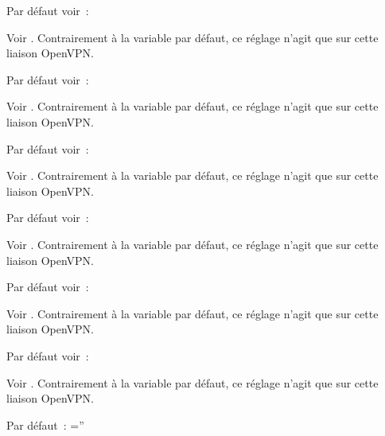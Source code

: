 \begin{description}

  Par défaut voir~: 

  Voir . Contrairement
  à la variable par défaut, ce réglage n'agit que sur cette liaison OpenVPN.


  Par défaut voir~: 

  Voir . Contrairement
  à la variable par défaut, ce réglage n'agit que sur cette liaison OpenVPN.


  Par défaut voir~: 

  Voir . Contrairement à la variable par
  défaut, ce réglage n'agit que sur cette liaison OpenVPN.


  Par défaut voir~: 

  Voir . Contrairement
  à la variable par défaut, ce réglage n'agit que sur cette liaison OpenVPN.


  Par défaut voir~: 

  Voir . Contrairement à
  la variable par défaut, ce réglage n'agit que sur cette liaison OpenVPN.


  Par défaut voir~: 

  Voir . Contrairement
  à la variable par défaut, ce réglage n'agit que sur cette liaison OpenVPN.


  Par défaut~: =''


\end{description}
